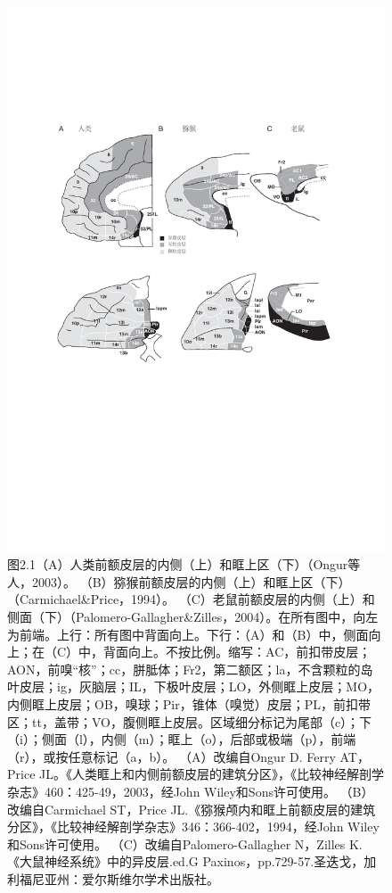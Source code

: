 \begin{figure}[!htb]
	\centering
	\includegraphics[width=0.8\linewidth]{image_pfc/Fig_2_1}
	\caption*{图2.1（A）人类前额皮层的内侧（上）和眶上区（下）（Ongur等人，2003）。 （B）猕猴前额皮层的内侧（上）和眶上区（下）（Carmichael\&Price，1994）。 （C）老鼠前额皮层的内侧（上）和侧面（下）（Palomero-Gallagher\&Zilles，2004）。在所有图中，向左为前端。上行：所有图中背面向上。下行：（A）和（B）中，侧面向上；在（C）中，背面向上。不按比例。缩写：AC，前扣带皮层；AON，前嗅“核”；cc，胼胝体；Fr2，第二额区；la，不含颗粒的岛叶皮层；ig，灰脑层；IL，下极叶皮层；LO，外侧眶上皮层；MO，内侧眶上皮层；OB，嗅球；Pir，锥体（嗅觉）皮层；PL，前扣带区；tt，盖带；VO，腹侧眶上皮层。区域细分标记为尾部（c）；下（i）；侧面（l），内侧（m）；眶上（o），后部或极端（p），前端（r），或按任意标记（a，b）。 （A）改编自Ongur D. Ferry AT，Price JL。《人类眶上和内侧前额皮层的建筑分区》，《比较神经解剖学杂志》460：425-49，2003，经John Wiley和Sons许可使用。 （B）改编自Carmichael ST，Price JL.《猕猴颅内和眶上前额皮层的建筑分区》，《比较神经解剖学杂志》346：366-402，1994，经John Wiley和Sons许可使用。 （C）改编自Palomero-Gallagher N，Zilles K.《大鼠神经系统》中的异皮层.ed.G Paxinos，pp.729-57.圣迭戈，加利福尼亚州：爱尔斯维尔学术出版社。}
\end{figure}

